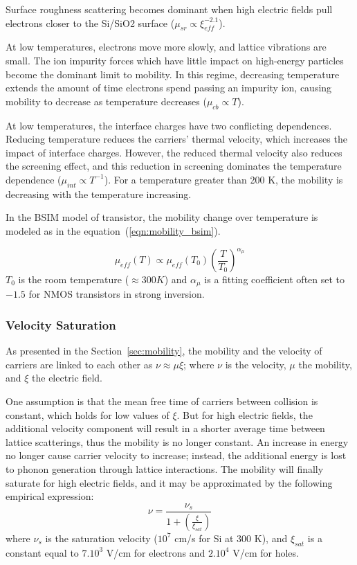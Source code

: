 Surface roughness scattering becomes dominant when high electric fields pull electrons closer to the Si/SiO2 surface (\(\mu_{sr} \varpropto \xi_{eff}^{-2.1} \))\cite{KLee1991}.

At low temperatures, electrons move more slowly, and lattice vibrations are
small. The ion impurity forces which have little impact on high-energy
particles become the dominant limit to mobility. In this regime, decreasing temperature extends the amount of time electrons spend passing an impurity ion, causing mobility to decrease as temperature decreases (\(\mu_{cb} \varpropto T \)).

At low temperatures, the interface charges have two conflicting dependences. Reducing temperature reduces the carriers’ thermal velocity, which increases the impact of interface charges. However, the reduced thermal velocity also reduces the screening effect\cite{Jeon1989}, and this reduction in screening dominates the temperature dependence (\(\mu_{int} \varpropto T^{-1} \)). For a temperature greater than 200 K, the mobility is decreasing with the temperature increasing.

In the BSIM model of transistor, the mobility change over temperature is modeled as in the equation~(\ref{eqn:mobility_bsim}).

\begin{equation}
\label{eqn:mobility_bsim}
\mu_{eff}(T) \varpropto \mu_{eff}(T_0) {\left(\frac{T}{T_0} \right)}^{\alpha_\mu}
\end{equation}
\(T_0 \) is the room temperature (\(\approx 300 K \)) and \(\alpha_\mu \) is a fitting coefficient often set to $-1.5$ for NMOS transistors in strong inversion.

\subsubsection{Velocity Saturation}    %
As presented in the Section~\ref{sec:mobility}, the mobility and the velocity of carriers are linked to each other as \(\nu \approx \mu \xi \); where \(\nu \) is the velocity, \(\mu \) the mobility, and \(\xi \) the electric field.

One assumption is that the mean free time of carriers between collision is constant, which holds for low values of \(\xi \). But for high electric fields, the additional velocity component will result in a shorter average time between lattice scatterings, thus the mobility is no longer constant. An increase in energy no longer cause carrier velocity to increase; instead, the additional energy is lost to phonon generation through lattice interactions. The mobility will finally saturate for high electric fields, and it may be approximated by the following empirical expression: 
\begin{equation}
\label{eqn:vsat}
\nu = \frac{\nu_s}{1 + \left(\frac{\xi}{\xi_{sat}}\right)}
\end{equation}
where \(\nu_s \) is the saturation velocity (\(10^7 \) cm/s for Si at 300 K), and \(\xi_{sat}\) is a constant equal to \(7.10^3 \) V/cm for electrons and \(2.10^4 \) V/cm for holes.

